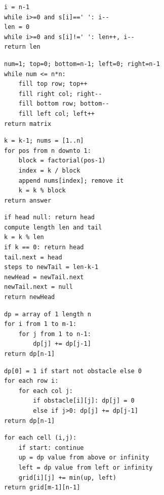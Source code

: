 \documentclass[11pt,a4paper]{ctexart}
\begin{document}
\begin{verbatim}
i = n-1
while i>=0 and s[i]==' ': i--
len = 0
while i>=0 and s[i]!=' ': len++, i--
return len
\end{verbatim}

\begin{verbatim}
num=1; top=0; bottom=n-1; left=0; right=n-1
while num <= n*n:
    fill top row; top++
    fill right col; right--
    fill bottom row; bottom--
    fill left col; left++
return matrix
\end{verbatim}

\begin{verbatim}
k = k-1; nums = [1..n]
for pos from n downto 1:
    block = factorial(pos-1)
    index = k / block
    append nums[index]; remove it
    k = k % block
return answer
\end{verbatim}

\begin{verbatim}
if head null: return head
compute length len and tail
k = k % len
if k == 0: return head
tail.next = head
steps to newTail = len-k-1
newHead = newTail.next
newTail.next = null
return newHead
\end{verbatim}

\begin{verbatim}
dp = array of 1 length n
for i from 1 to m-1:
    for j from 1 to n-1:
        dp[j] += dp[j-1]
return dp[n-1]
\end{verbatim}

\begin{verbatim}
dp[0] = 1 if start not obstacle else 0
for each row i:
    for each col j:
        if obstacle[i][j]: dp[j] = 0
        else if j>0: dp[j] += dp[j-1]
return dp[n-1]
\end{verbatim}

\begin{verbatim}
for each cell (i,j):
    if start: continue
    up = dp value from above or infinity
    left = dp value from left or infinity
    grid[i][j] += min(up, left)
return grid[m-1][n-1]
\end{verbatim}
\end{document}
